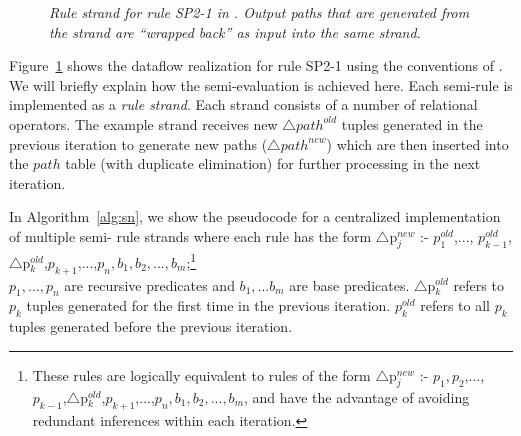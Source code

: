 

\begin{figure}[ht]
\centering
{}
\caption{\label{Dataflow}\emph{\small Rule strand for rule SP2-1 in
    \Sys. Output paths that are generated from the strand are ``wrapped
    back'' as input into the same strand. }}
\end{figure}                                        

Figure~\ref{Dataflow} shows the dataflow realization for rule SP2-1
using the conventions of \Sys. We will briefly explain how the semi-\naive evaluation is
achieved here. Each semi-\naive rule is implemented as a {\em rule strand}. Each strand
consists of a number of relational operators. The example strand
receives new $\triangle$$path^{old}$ tuples generated in the previous
iteration to generate new paths ($\triangle$$path^{new}$) which are
then inserted into the $path$ table (with duplicate elimination) for
further processing in the next iteration. 

In Algorithm~\ref{alg:sn}, we show the pseudocode for a centralized
\Sys implementation of multiple semi-\naive
rule strands where each rule has the form $\triangle$p$^{new}_{j}$ :-
$p^{old}_{1}$,..., $p^{old}_{k-1}$,$\triangle$p$^{old}_{k}$,$p_{k+1}$,...,$p_{n},b_{1},
b_{2},...,b_{m}$;\footnote{These rules are logically equivalent to rules
  of the form $\triangle$p$^{new}_{j}$ :- $p_{1},p_{2}$,...,$p_{k-1}$,$\triangle$p$^{old}_{k}$,$p_{k+1}$,...,$p_{n},b_{1},b_{2},...,b_{m}$,
  and have the advantage of avoiding redundant inferences within each iteration.}
\\$p_{1},...,p_{n}$ are recursive predicates and $b_{1},...b_{m}$ are base
predicates. $\triangle$p$^{old}_{k}$ refers to $p_{k}$ tuples generated
for the first time in the previous iteration. $p^{old}_{k}$
refers to all $p_{k}$ tuples generated before the previous iteration.


